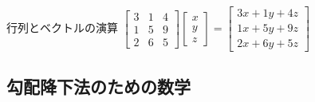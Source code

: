 \documentclass[dvipdfmx,aspectratio=169]{beamer}
\begin{document}
	\begin{frame}{行列とベクトルの演算}
		$ \begin{bmatrix}
			3&1&4\\
			1&5&9\\
			2&6&5
		\end{bmatrix}\begin{bmatrix}
			x\\y\\z
		\end{bmatrix} = \begin{bmatrix}
			3x+1y+4z\\
			1x+5y+9z\\
			2x+6y+5z
		\end{bmatrix} $
	\end{frame}
	\subsection{勾配降下法のための数学}
\end{document}
